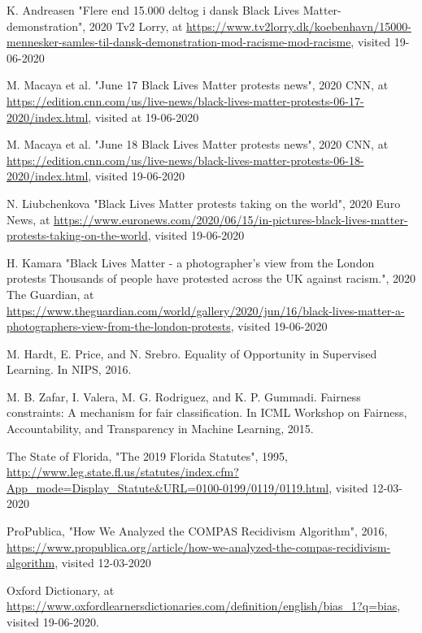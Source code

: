 \documentclass[11pt, fleqn, titlepage]{article}
\begin{document}
	\begin{thebibliography}{9} \label{bibliography}
		
		 K. Andreasen "Flere end 15.000 deltog i dansk Black Lives Matter-demonstration", 2020 Tv2 Lorry, at \url{https://www.tv2lorry.dk/koebenhavn/15000-mennesker-samles-til-dansk-demonstration-mod-racisme-mod-racisme}, visited 19-06-2020
		
		  M. Macaya et al. "June 17 Black Lives Matter protests news", 2020 CNN, at \url{https://edition.cnn.com/us/live-news/black-lives-matter-protests-06-17-2020/index.html}, visited at 19-06-2020
		
		 M. Macaya et al. "June 18 Black Lives Matter protests news", 2020 CNN, at \url{https://edition.cnn.com/us/live-news/black-lives-matter-protests-06-18-2020/index.html}, visited 19-06-2020
		
		 N. Liubchenkova "Black Lives Matter protests taking on the world", 2020 Euro News, at \url{https://www.euronews.com/2020/06/15/in-pictures-black-lives-matter-protests-taking-on-the-world}, visited 19-06-2020
		
		 H. Kamara "Black Lives Matter - a photographer's view from the London protests
		Thousands of people have protested across the UK against racism.", 2020 The Guardian, at \url{https://www.theguardian.com/world/gallery/2020/jun/16/black-lives-matter-a-photographers-view-from-the-london-protests}, visited 19-06-2020
		
		 M. Hardt, E. Price, and N. Srebro. Equality of Opportunity in Supervised Learning. In NIPS, 2016.
		
		 M. B. Zafar, I. Valera, M. G. Rodriguez, and K. P. Gummadi. Fairness constraints: A mechanism for fair classification.
		In ICML Workshop on Fairness, Accountability, and Transparency in Machine Learning, 2015.
		
		 The State of Florida, "The 2019 Florida Statutes", 1995,  \url{http://www.leg.state.fl.us/statutes/index.cfm?App_mode=Display_Statute&URL=0100-0199/0119/0119.html}, visited 12-03-2020
		
		 ProPublica, "How We Analyzed the COMPAS Recidivism Algorithm", 2016, \url{https://www.propublica.org/article/how-we-analyzed-the-compas-recidivism-algorithm}, visited 12-03-2020
		
		 Oxford Dictionary, at \url{https://www.oxfordlearnersdictionaries.com/definition/english/bias_1?q=bias}, visited 19-06-2020.
		

\end{thebibliography}
\end{document}
